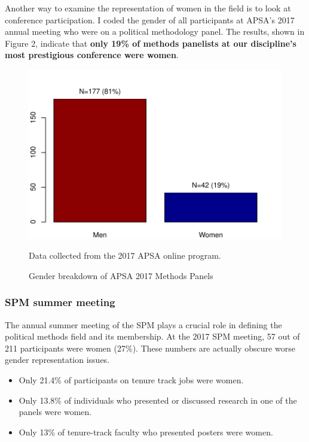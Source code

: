 \documentclass[12pt]{texMemo}
\begin{document}
Another way to examine the representation of women in the field is to look at conference participation. I coded the gender of all participants at APSA's 2017 annual meeting who were on a political methodology panel.  The results, shown in Figure 2, indicate that \textbf{only 19\% of methods panelists at our discipline's most prestigious conference were women}.
\vspace{-.6cm}
\begin{figure}[htbp]
\caption{Gender breakdown of APSA 2017 Methods Panels}

\begin{center}
\includegraphics[scale=.5]{apsaGender}
\end{center}


\footnotesize Data collected from the 2017 APSA online program.
\end{figure}
\vspace{-.2in}


\subsubsection*{SPM summer meeting}

The annual summer meeting of the SPM plays a crucial role in defining the political methods field and its membership.  At the 2017 SPM meeting, 57 out of 211 participants were women (27\%).  These numbers are actually obscure worse gender representation issues.   
\begin{itemize} \setlength\itemsep{0em}
\item Only 21.4\% of participants on tenure track jobs were women.   
\item Only 13.8\% of individuals who presented or discussed research in one of the panels were women.
\item  Only 13\% of tenure-track faculty who presented posters were women.
\end{itemize}
\end{document}
